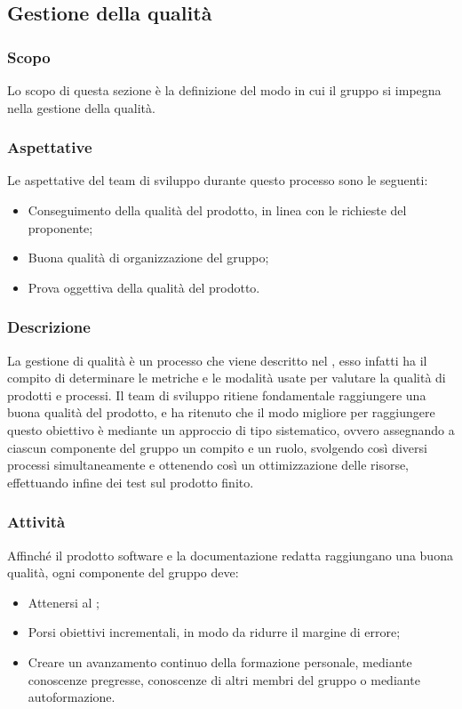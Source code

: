 \subsection{Gestione della qualità}\label{subsection: gestione_qualita}
\subsubsection{Scopo}
Lo scopo di questa sezione è la definizione del modo in cui il gruppo si impegna nella gestione della qualità.
\subsubsection{Aspettative}
Le aspettative del team di sviluppo durante questo processo sono le seguenti:
\begin {itemize}
\item Conseguimento della qualità del prodotto, in linea con le richieste del proponente;
\item Buona qualità di organizzazione del gruppo;
\item Prova oggettiva della qualità del prodotto.
\end {itemize}
\subsubsection{Descrizione}
La gestione di qualità è un processo che viene descritto nel \docNamePdQLow{}, esso infatti ha il compito di determinare le metriche e le modalità usate per valutare la qualità di prodotti e processi.
Il team di sviluppo ritiene fondamentale raggiungere una buona qualità del prodotto, e ha ritenuto che il modo migliore per raggiungere questo obiettivo è mediante un approccio di tipo sistematico, ovvero assegnando a ciascun componente del gruppo un compito e un ruolo, svolgendo così diversi processi simultaneamente e ottenendo così un ottimizzazione delle risorse, effettuando infine dei test sul prodotto finito.
\subsubsection{Attività}
Affinché il prodotto software e la documentazione redatta raggiungano una buona qualità, ogni componente del gruppo \groupName{} deve:
\begin{itemize}
\item Attenersi al \docNamePdQLow{};
\item Porsi obiettivi incrementali, in modo da ridurre il margine di errore;
\item Creare un avanzamento continuo della formazione personale, mediante conoscenze pregresse, conoscenze di altri membri del gruppo o mediante autoformazione.
\end {itemize}
